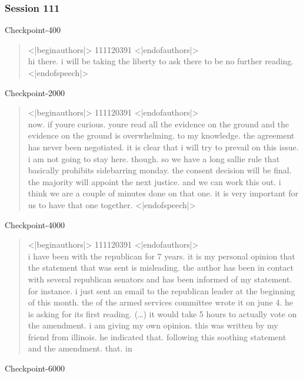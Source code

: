 \documentclass[11pt]{article}
\begin{document}
\subsubsection{Session 111}
\label{sec:orgc1f202f}

Checkpoint-400

\begin{quote}
<|beginauthors|> 111120391 <|endofauthors|> \\
hi there. i will be taking the liberty to ask there to be no further reading. <|endofspeech|> 
\end{quote}

\noindent 
Checkpoint-2000

\begin{quote}
<|beginauthors|> 111120391 <|endofauthors|> \\
now. if youre curious. youre read all the evidence on the ground and the evidence on the ground is overwhelming. to my knowledge. the agreement has never been negotiated. it is clear that i will try to prevail on this issue. i am not going to stay here. though. so we have a long sallie rule that basically prohibits sidebarring monday. the consent decision will be final. the majority will appoint the next justice. and we can work this out. i think we are a couple of minutes done on that one. it is very important for us to have that one together. <|endofspeech|>
\end{quote}

\noindent 
Checkpoint-4000

\begin{quote}
<|beginauthors|> 111120391 <|endofauthors|> \\
i have been with the republican  for 7 years. it is my personal opinion that the statement that was sent is misleading. the author has been in contact with several republican senators and has been informed of my statement. for instance. i just sent an email to the republican leader at the beginning of this month. the  of the armed services committee wrote it on june 4. he is asking for its first reading. (…) it would take 5 hours to actually vote on the amendment. i am giving my own opinion. this was written by my friend from illinois. he indicated that. following this soothing statement and the amendment. that. in
\end{quote}

\noindent 
Checkpoint-6000
\end{document}

